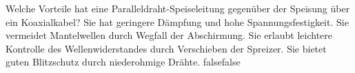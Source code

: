     {Welche Vorteile hat eine Paralleldraht-Speiseleitung gegenüber der Speisung über ein Koaxialkabel?}
    {Sie hat geringere Dämpfung und hohe Spannungsfestigkeit.}
    {Sie vermeidet Mantelwellen durch Wegfall der Abschirmung.}
    {Sie erlaubt leichtere Kontrolle des Wellenwiderstandes durch Verschieben der Spreizer.}
    {Sie bietet guten Blitzschutz durch niederohmige Drähte.}
    {false}{false}